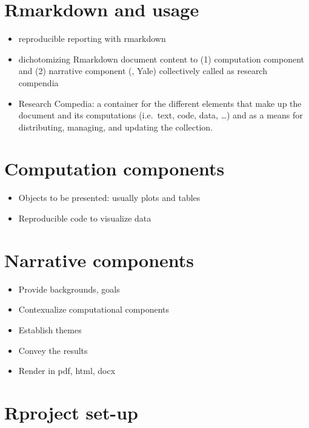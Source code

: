 \documentclass[
]{book}
\providecommand{\tightlist}{%
  \setlength{\itemsep}{0pt}\setlength{\parskip}{0pt}}
\begin{document}
\hypertarget{rmarkdown-and-usage}{%
\section{Rmarkdown and usage}\label{rmarkdown-and-usage}}

\begin{itemize}
\item
  reproducible reporting with rmarkdown
\item
  dichotomizing Rmarkdown document content to (1) computation component and (2) narrative component (\citet{MikeKane}, Yale) collectively called as research compendia
\item
  Research Compedia: a container for the different elements that make up the document and its computations (i.e.~text, code, data, \ldots) and as a means for distributing, managing, and updating the collection.
\end{itemize}

\hypertarget{computation-components}{%
\section{Computation components}\label{computation-components}}

\begin{itemize}
\tightlist
\item
  Objects to be presented: usually plots and tables
\item
  Reproducible code to visualize data
\end{itemize}

\hypertarget{narrative-components}{%
\section{Narrative components}\label{narrative-components}}

\begin{itemize}
\tightlist
\item
  Provide backgrounds, goals
\item
  Contexualize computational components
\item
  Establish themes
\item
  Convey the results
\item
  Render in pdf, html, docx
\end{itemize}

\hypertarget{rproject-set-up}{%
\section{Rproject set-up}\label{rproject-set-up}}
\end{document}
